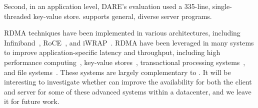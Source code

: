 % 
% 

Second, in an application level, DARE's evaluation used a 335-line, 
single-threaded key-value store. \xxx supports general, diverse server 
programs.





 RDMA techniques have been implemented in various 
architectures, including Infiniband~\cite{infiniband}, RoCE~\cite{roce}, and 
iWRAP~\cite{iwrap}. RDMA have been leveraged in many systems to improve 
application-specific latency and throughput, including high performance 
computing~\cite{openmpi}, key-value 
stores~\cite{pilaf:usenix14,herd:sigcomm14,farm:nsdi14,memcached:rdma}, 
transactional processing systems~\cite{drtm:sosp15,farm:sosp15}, and file 
systems~\cite{gibson:nfs}. These systems are largely complementary to \xxx. It 
will be interesting to investigate whether \xxx can improve the availability for 
both the client and server for some of these advanced systems within a 
datacenter, and we leave it for future work.

